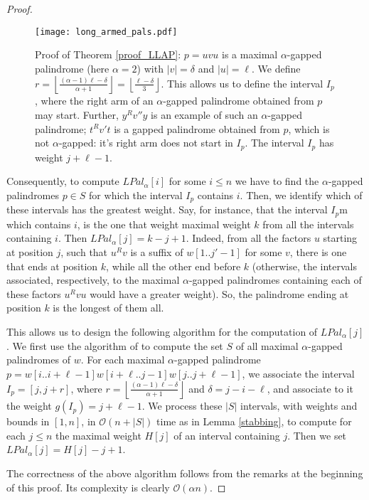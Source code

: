 \documentclass[final]{dmtcs-episciences}
\newcommand{\bigo}{{\mathcal O}}
\newcommand{\LP}{{\mathit{LPal}}_\alpha}
\begin{document}
\begin{proof}
\begin{figure}
\begin{center}
\texttt{[image: long\_armed\_pals.pdf]}
\end{center}
\vspace{-0.5cm}
\caption{Proof of Theorem \ref{proof_LLAP}: $p=uvu$ is a maximal $\alpha$-gapped palindrome (here $\alpha=2$) with $|v|=\delta$ and $|u|=\ell$. We define $r=\left \lfloor \frac{(\alpha-1)\ell-\delta}{\alpha +1}\right\rfloor=\left \lfloor \frac{\ell-\delta}{3}\right\rfloor$. This allows us to define the interval $I_p$, where the right arm of an $\alpha$-gapped palindrome obtained from $p$ may start. Further, $y^Rv''y$ is an example of such an $\alpha$-gapped palindrome; $t^Rv't$ is a gapped palindrome obtained from $p$, which is not $\alpha$-gapped: it's right arm does not start in $I_p$.
The interval $I_p$ has weight $j+\ell-1$.}
\end{figure}
 
Consequently, to compute $\LP[i]$ for some $i\leq n$ we have to find the $\alpha$-gapped palindromes $p\in S$ for which the interval $I_p$ contains $i$. Then, we identify which of these intervals has the greatest weight. Say, for instance, that the interval $I_p$m which contains $i$, is the one that weight maximal weight $k$ from all the intervals containing $i$. Then $\LP[j]=k-j+1$. Indeed, from all the factors $u$ starting at position $j$, such that $u^Rv$ is a suffix of $w[1..j'-1]$ for some $v$, there is one that ends at position $k$, while all the other end before $k$ (otherwise, the intervals associated, respectively, to the maximal $\alpha$-gapped palindromes containing each of these factors $u^Rvu$ would have a greater weight). So, the palindrome ending at position $k$ is the longest of them all.

This allows us to design the following algorithm for the computation of $\LP[j]$. We first use the algorithm of \cite{KK09} to compute the set $S$ of all maximal $\alpha$-gapped palindromes of $w$. For each maximal $\alpha$-gapped palindrome $p=w[i..i+\ell-1]w[i+\ell..j-1]w[j..j+\ell-1]$, we associate the interval $I_p=[j,j+r]$, where $r=\left \lfloor \frac{(\alpha-1)\ell-\delta}{\alpha +1}\right\rfloor$  and $\delta=j-i-\ell$, and associate to it the weight $g(I_p)=j+\ell-1$. We process these $|S|$ intervals, with weights and bounds in $[1,n]$, in $\bigo(n+|S|)$ time as in Lemma \ref{stabbing}, to compute for each $j\leq n$ the maximal weight $H[j]$ of an interval containing $j$. Then we set $\LP[j]=H[j]-j+1$. 

The correctness of the above algorithm follows from the remarks at the beginning of this proof. Its complexity is clearly $\bigo(\alpha n)$. 
\end{proof}
\end{document}
